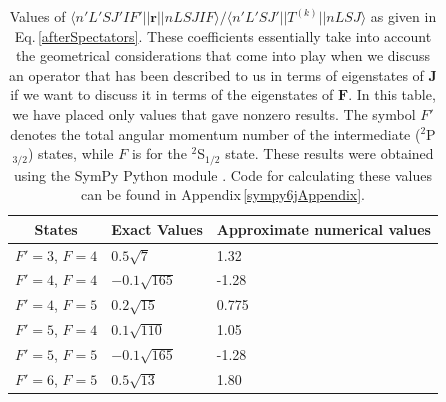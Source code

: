\begin{table}[h!]
\centering
\begin{tabular}{|c|l|l|}
\hline
States & Exact Values & Approximate numerical values\\
\hline
$F'=3$, $F=4$&$0.5 \sqrt{7}$&1.32\\ 
$F'=4$, $F=4$&$- 0.1 \sqrt{165}$&-1.28\\ 
$F'=4$, $F=5$&$0.2 \sqrt{15}$&0.775\\ 
$F'=5$, $F=4$&$0.1 \sqrt{110}$&1.05\\ 
$F'=5$, $F=5$&$- 0.1 \sqrt{165}$&-1.28\\ 
$F'=6$, $F=5$&$0.5 \sqrt{13}$&1.80\\ 
\hline
\end{tabular}
\caption{Values of $\langle n' L' S J' I F' ||\mathbf{r}||n L S J I F\rangle / \langle n'L' S J'||T^{(k)}|| n L S J\rangle$ as given in Eq.\,\ref{afterSpectators}. These coefficients essentially take into account the geometrical considerations that come into play when we discuss an operator that has been described to us in terms of eigenstates of $\mathbf{J}$ if we want to discuss it in terms of the eigenstates of $\mathbf{F}$. In this table, we have placed only values that gave nonzero results. The symbol $F'$ denotes the total angular momentum number of the intermediate ($^2$P$_{3/2}$) states, while $F$ is for the $^2$S$_{1/2}$ state. These results were obtained using the SymPy Python module \cite{sympy}\cite{rasch6j}. Code for calculating these values can be found in Appendix\,\ref{sympy6jAppendix}.
\label{coefficient_calculated}}
\end{table}

